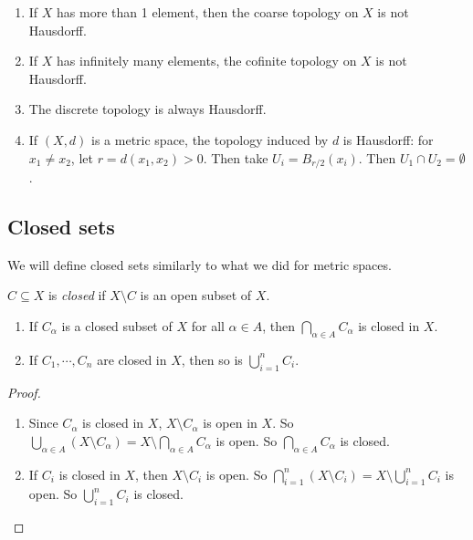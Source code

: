 \documentclass[a4paper]{article}
\begin{document}
\begin{eg}\leavevmode
  \begin{enumerate}
    \item If $X$ has more than 1 element, then the coarse topology on $X$ is not Hausdorff.
    \item If $X$ has infinitely many elements, the cofinite topology on $X$ is not Hausdorff.
    \item The discrete topology is always Hausdorff.
    \item If $(X, d)$ is a metric space, the topology induced by $d$ is Hausdorff: for $x_1 \not= x_2$, let $r = d(x_1, x_2) > 0$. Then take $U_i = B_{r/2}(x_i)$. Then $U_1 \cap U_2 = \emptyset$.
  \end{enumerate}
\end{eg}

\subsection{Closed sets}
We will define closed sets similarly to what we did for metric spaces.

\begin{defi}
  $C\subseteq X$ is \emph{closed} if $X\setminus C$ is an open subset of $X$.
\end{defi}

\begin{lemma}\leavevmode
  \begin{enumerate}
    \item If $C_\alpha$ is a closed subset of $X$ for all $\alpha \in A$, then $\bigcap_{\alpha \in A} C_\alpha$ is closed in $X$.
    \item If $C_1, \cdots, C_n$ are closed in $X$, then so is $\bigcup_{i = 1}^n C_i$.
  \end{enumerate}
\end{lemma}

\begin{proof}\leavevmode
  \begin{enumerate}
    \item Since $C_\alpha$ is closed in $X$, $X \setminus C_\alpha$ is open in $X$. So $\bigcup_{\alpha\in A}(X\setminus C_\alpha) = X\setminus \bigcap_{\alpha\in A}C_\alpha$ is open. So $\bigcap_{\alpha \in A}C_\alpha$ is closed.

    \item If $C_i$ is closed in $X$, then $X\setminus C_i$ is open. So $\bigcap_{i = 1}^n (X\setminus C_i) = X\setminus \bigcup_{i = 1}^n C_i$ is open. So $\bigcup_{i = 1}^n C_i$ is closed.\qedhere
  \end{enumerate}
\end{proof}
\end{document}
